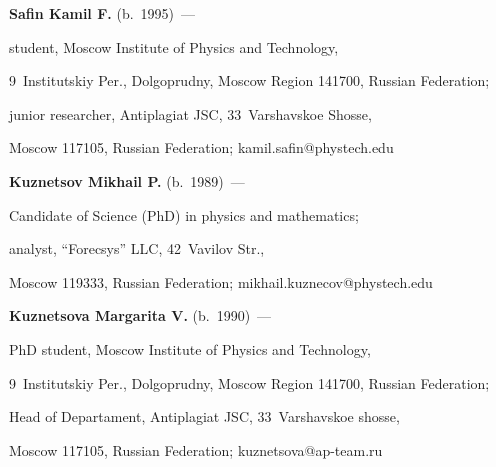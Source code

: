 \textbf{Safin Kamil F.} (b.\ 1995)~--- 

student, Moscow Institute of Physics and Technology, 

9~Institutskiy Per., Dolgoprudny, Moscow Region 141700, Russian Federation; 

junior researcher, Antiplagiat JSC,  33~Varshavskoe Shosse, 

Moscow 117105, Russian Federation; \mbox{kamil.safin@phystech.edu}



\noindent

\textbf{Kuznetsov  Mikhail P.} (b.\ 1989)~--- 

Candidate of Science (PhD) in physics and mathematics; 

analyst, ``Forecsys'' LLC, 42~Vavilov Str.,  

Moscow 119333, Russian Federation; \mbox{mikhail.kuznecov@phystech.edu} 





\noindent

\textbf{Kuznetsova Margarita V.} (b.\ 1990)~---

PhD student, Moscow Institute of Physics and Technology, 

9~Institutskiy Per., Dolgoprudny, Moscow Region 141700, Russian Federation; 

Head of Departament, Antiplagiat JSC,  33~Varshavskoe shosse, 

Moscow 117105, Russian Federation; \mbox{kuznetsova@ap-team.ru}



\label{end\stat}





\renewcommand{\bibname}{\protect\rm Литература} 

